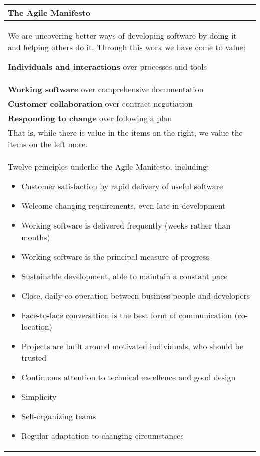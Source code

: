 \begin {center}
  \begin{longtable}[h!]{|p{}|}
    \hline
    \textbf{The Agile Manifesto}\\
    \hline
    
    We are uncovering better ways of developing software by doing it and helping others do it. Through this work we have come to value:

    \textbf{Individuals and interactions} over processes and tools \\
    \textbf{Working software} over comprehensive documentation\\
    \textbf{Customer collaboration} over contract negotiation\\
    \textbf{Responding to change} over following a plan\\
    That is, while there is value in the items on the right, we value the items on the left more.\\

    Twelve principles underlie the Agile Manifesto, including:
    \begin{itemize}
    \item Customer satisfaction by rapid delivery of useful software
    \item Welcome changing requirements, even late in development
    \item Working software is delivered frequently (weeks rather than months)
    \item Working software is the principal measure of progress
    \item Sustainable development, able to maintain a constant pace
    \item Close, daily co-operation between business people and developers
    \item Face-to-face conversation is the best form of communication (co-location)
    \item Projects are built around motivated individuals, who should be trusted
    \item Continuous attention to technical excellence and good design
    \item Simplicity
    \item Self-organizing teams
    \item Regular adaptation to changing circumstances
    \end{itemize}\\
    \hline
  \end{longtable}
\end{center}

